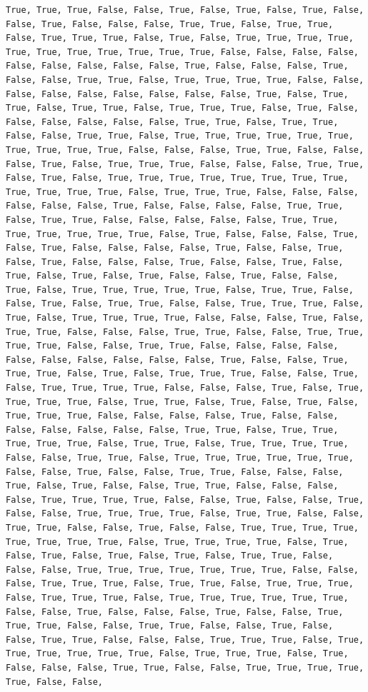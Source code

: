 \documentclass[
  letterpaper,
  DIV=11,
  numbers=noendperiod]{scrartcl}
\begin{document}
\begin{verbatim}
True, True, True, False, False, True, False, True, False, True, False, False, True, False, False, False, True, True, False, True, True, False, True, True, True, False, True, False, True, True, True, True, True, True, True, True, True, True, True, False, False, False, False, False, False, False, False, False, True, False, False, False, True, False, False, True, True, False, True, True, True, True, False, False, False, False, False, False, False, False, False, True, False, True, True, False, True, True, False, True, True, True, False, True, False, False, False, False, False, False, True, True, False, True, True, False, False, True, True, False, True, True, True, True, True, True, True, True, True, True, False, False, False, True, True, False, False, False, True, False, True, True, True, False, False, False, True, True, False, True, False, True, True, True, True, True, True, True, True, True, True, True, True, False, True, True, True, False, False, False, False, False, False, True, False, False, False, False, True, True, False, True, True, False, False, False, False, False, True, True, True, True, True, True, True, False, True, False, False, False, True, False, True, False, False, False, False, True, False, False, True, False, True, False, False, False, True, False, False, True, False, True, False, True, False, True, False, False, True, False, False, True, False, True, True, True, True, True, False, True, True, False, False, True, False, True, True, False, False, True, True, True, False, True, False, True, True, True, True, False, False, False, True, False, True, True, False, False, False, True, True, False, False, True, True, True, True, False, False, True, True, False, False, False, False, False, False, False, False, False, False, True, False, False, True, True, True, False, True, False, True, True, True, False, False, True, False, True, True, True, True, False, False, False, True, False, True, True, True, True, False, True, True, False, True, False, True, False, True, True, True, False, False, False, False, True, False, False, False, False, False, False, False, True, True, False, True, True, True, True, True, False, True, True, False, True, True, True, True, False, False, True, True, False, True, True, True, True, True, True, False, False, True, False, False, True, True, False, False, False, True, False, True, False, False, True, True, False, False, False, False, True, True, True, True, False, False, True, False, False, True, False, False, True, True, True, True, False, True, True, False, False, True, True, False, False, True, False, False, True, True, True, True, True, True, True, True, False, True, True, True, True, False, True, False, True, False, True, False, True, False, True, True, False, False, False, True, True, True, True, True, True, True, False, False, False, True, True, True, False, True, True, False, True, True, True, False, True, True, True, False, True, True, True, True, True, True, False, False, True, False, False, False, True, False, False, True, True, True, False, False, True, True, False, False, True, False, False, True, True, False, False, False, True, True, True, False, True, True, True, True, True, True, False, True, True, True, False, True, False, False, False, True, True, False, False, True, True, True, True, True, False, False, 
\end{verbatim}
\end{document}
